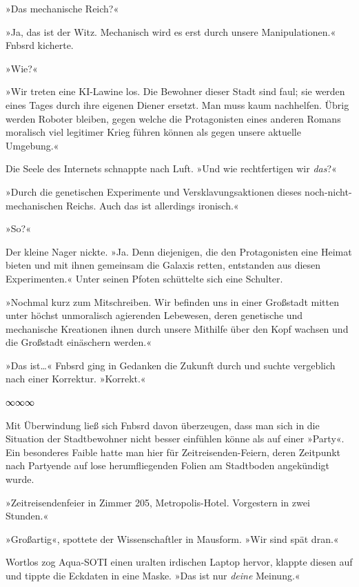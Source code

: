 »Das mechanische Reich?«

»Ja, das ist der Witz. Mechanisch wird es erst durch unsere Manipulationen.« Fnbsrd kicherte.

»Wie?«

»Wir treten eine KI-Lawine los. Die Bewohner dieser Stadt sind faul; sie werden eines Tages durch ihre eigenen Diener ersetzt. Man muss kaum nachhelfen. Übrig werden Roboter bleiben, gegen welche die Protagonisten eines anderen Romans moralisch viel legitimer Krieg führen können als gegen unsere aktuelle Umgebung.«

Die Seele des Internets schnappte nach Luft. »Und wie rechtfertigen wir \emph{das}?«

»Durch die genetischen Experimente und Versklavungsaktionen dieses noch-nicht-mechanischen Reichs. Auch das ist allerdings ironisch.«

»So?«

Der kleine Nager nickte. »Ja. Denn diejenigen, die den Protagonisten eine Heimat bieten und mit ihnen gemeinsam die Galaxis retten, entstanden aus diesen Experimenten.« Unter seinen Pfoten schüttelte sich eine Schulter.

»Nochmal kurz zum Mitschreiben. Wir befinden uns in einer Großstadt mitten unter höchst unmoralisch agierenden Lebewesen, deren genetische und mechanische Kreationen ihnen durch unsere Mithilfe über den Kopf wachsen und die Großstadt einäschern werden.«

»Das ist…« Fnbsrd ging in Gedanken die Zukunft durch und suchte vergeblich nach einer Korrektur. »Korrekt.«

\begin{center}
∞∞∞
\end{center}

Mit Überwindung ließ sich Fnbsrd davon überzeugen, dass man sich in die Situation der Stadtbewohner nicht besser einfühlen könne als auf einer »Party«. Ein besonderes Faible hatte man hier für Zeitreisenden-Feiern, deren Zeitpunkt nach Partyende auf lose herumfliegenden Folien am Stadtboden angekündigt wurde.

»Zeitreisendenfeier in Zimmer 205, Metropolis-Hotel. Vorgestern in zwei Stunden.«

»Großartig«, spottete der Wissenschaftler in Mausform. »Wir sind spät dran.«

Wortlos zog Aqua-SOTI einen uralten irdischen Laptop hervor, klappte diesen auf und tippte die Eckdaten in eine Maske. »Das ist nur \emph{deine} Meinung.«

